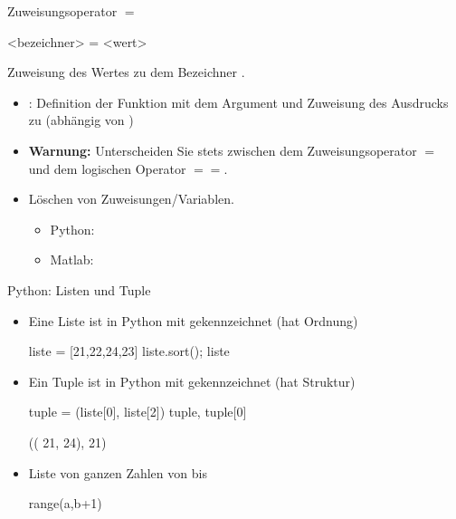 \documentclass[hyperref={xetex}]{beamer}
\begin{document}
\begin{frame}[fragile]{Zuweisungsoperator $=$}
    \begin{pyin}
<bezeichner> = <wert>
    \end{pyin}   
Zuweisung des Wertes  zu dem Bezeichner .
\begin{itemize}
\item {\color{blue} }: Definition der Funktion  mit dem Argument  und Zuweisung des Ausdrucks  zu (abhängig von )
\item \textbf{Warnung:} Unterscheiden Sie  stets zwischen dem Zuweisungsoperator {\color{blue} $=$} und
dem logischen Operator {\color{blue} $==$}.   
\item Löschen von Zuweisungen/Variablen.
\begin{itemize}
\item Python: {\color{blue} }
\item Matlab: {\color{blue} }
\end{itemize}
\end{itemize}
\end{frame}

\begin{frame}[fragile]{Python: Listen und Tuple}
 \begin{itemize}
\item Eine \alert{Liste} ist in Python mit \isage{[..,..]} gekennzeichnet (hat Ordnung) 
\begin{pyin}
liste = [21,22,24,23]
liste.sort(); liste 
\end{pyin}
\begin{pyout}
 [21, 22, 23, 24]
\end{pyout}
\item Ein \alert{Tuple} ist in Python mit  gekennzeichnet (hat Struktur)
\begin{pyin}
tuple = (liste[0], liste[2])
tuple, tuple[0]
\end{pyin}
\begin{pyout}
(( 21, 24), 21) 
\end{pyout}
\item Liste von ganzen Zahlen von  bis 
\begin{pyin}
range(a,b+1)
\end{pyin}
 \end{itemize}
\end{frame}
\end{document}
